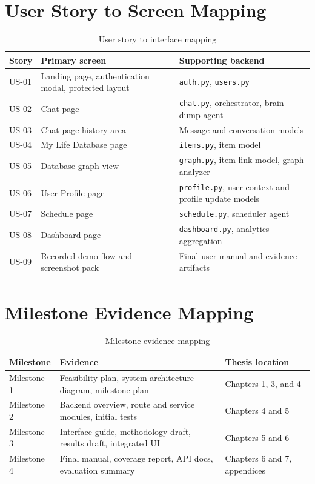 \section{User Story to Screen Mapping}

\begin{longtable}{|p{}|p{}|p{}|}
\caption{User story to interface mapping}
\label{tab:story-screen-map}\\
\hline
\textbf{Story} & \textbf{Primary screen} & \textbf{Supporting backend}\\
\hline
US-01 & Landing page, authentication modal, protected layout & \texttt{auth.py}, \texttt{users.py}\\
\hline
US-02 & Chat page & \texttt{chat.py}, orchestrator, brain-dump agent\\
\hline
US-03 & Chat page history area & Message and conversation models\\
\hline
US-04 & My Life Database page & \texttt{items.py}, item model\\
\hline
US-05 & Database graph view & \texttt{graph.py}, item link model, graph analyzer\\
\hline
US-06 & User Profile page & \texttt{profile.py}, user context and profile update models\\
\hline
US-07 & Schedule page & \texttt{schedule.py}, scheduler agent\\
\hline
US-08 & Dashboard page & \texttt{dashboard.py}, analytics aggregation\\
\hline
US-09 & Recorded demo flow and screenshot pack & Final user manual and evidence artifacts\\
\hline
\end{longtable}

\section{Milestone Evidence Mapping}

\begin{longtable}{|p{}|p{}|p{}|}
\caption{Milestone evidence mapping}
\label{tab:milestone-map}\\
\hline
\textbf{Milestone} & \textbf{Evidence} & \textbf{Thesis location}\\
\hline
Milestone 1 & Feasibility plan, system architecture diagram, milestone plan & Chapters 1, 3, and 4\\
\hline
Milestone 2 & Backend overview, route and service modules, initial tests & Chapters 4 and 5\\
\hline
Milestone 3 & Interface guide, methodology draft, results draft, integrated UI & Chapters 5 and 6\\
\hline
Milestone 4 & Final manual, coverage report, API docs, evaluation summary & Chapters 6 and 7, appendices\\
\hline
\end{longtable}

